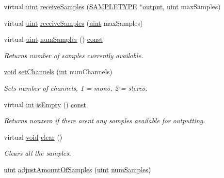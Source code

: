 \begin{DoxyCompactItemize}
\item 
virtual \hyperlink{_s_t_types_8h_a91ad9478d81a7aaf2593e8d9c3d06a14}{uint} \hyperlink{classsoundtouch_1_1_f_i_f_o_sample_buffer_a9bec369673be4b4d328befe0afd9f137}{receive\+Samples} (\hyperlink{namespacesoundtouch_a97cfd29a7abb4d4b2a72f803d5b5850c}{S\+A\+M\+P\+L\+E\+T\+Y\+PE} $\ast$\hyperlink{mm_8c_aeb3fcf4ab0f02cc4420e5a97568a07ef}{output}, \hyperlink{_s_t_types_8h_a91ad9478d81a7aaf2593e8d9c3d06a14}{uint} max\+Samples)
\item 
virtual \hyperlink{_s_t_types_8h_a91ad9478d81a7aaf2593e8d9c3d06a14}{uint} \hyperlink{classsoundtouch_1_1_f_i_f_o_sample_buffer_a1956c4d63018ed733d70125337265372}{receive\+Samples} (\hyperlink{_s_t_types_8h_a91ad9478d81a7aaf2593e8d9c3d06a14}{uint} max\+Samples)
\item 
virtual \hyperlink{_s_t_types_8h_a91ad9478d81a7aaf2593e8d9c3d06a14}{uint} \hyperlink{classsoundtouch_1_1_f_i_f_o_sample_buffer_a6b6b914d52e4e5d952f160e9c3b54d66}{num\+Samples} () \hyperlink{getopt1_8c_a2c212835823e3c54a8ab6d95c652660e}{const} 
\begin{DoxyCompactList}\small\item\em Returns number of samples currently available. \end{DoxyCompactList}\item 
\hyperlink{sound_8c_ae35f5844602719cf66324f4de2a658b3}{void} \hyperlink{classsoundtouch_1_1_f_i_f_o_sample_buffer_a8e9630f4f9c41ef1be3f44d546be0e87}{set\+Channels} (\hyperlink{xmltok_8h_a5a0d4a5641ce434f1d23533f2b2e6653}{int} num\+Channels)
\begin{DoxyCompactList}\small\item\em Sets number of channels, 1 = mono, 2 = stereo. \end{DoxyCompactList}\item 
virtual \hyperlink{xmltok_8h_a5a0d4a5641ce434f1d23533f2b2e6653}{int} \hyperlink{classsoundtouch_1_1_f_i_f_o_sample_buffer_a6e42894951c896ed0e71bd90ccdf9147}{is\+Empty} () \hyperlink{getopt1_8c_a2c212835823e3c54a8ab6d95c652660e}{const} 
\begin{DoxyCompactList}\small\item\em Returns nonzero if there aren\textquotesingle{}t any samples available for outputting. \end{DoxyCompactList}\item 
virtual \hyperlink{sound_8c_ae35f5844602719cf66324f4de2a658b3}{void} \hyperlink{classsoundtouch_1_1_f_i_f_o_sample_buffer_a2b211a51e213f86e2e5a03d0715da7b5}{clear} ()
\begin{DoxyCompactList}\small\item\em Clears all the samples. \end{DoxyCompactList}\item 
\hyperlink{_s_t_types_8h_a91ad9478d81a7aaf2593e8d9c3d06a14}{uint} \hyperlink{classsoundtouch_1_1_f_i_f_o_sample_buffer_a3f32f4db9c4268c9be61a32acd715f5f}{adjust\+Amount\+Of\+Samples} (\hyperlink{_s_t_types_8h_a91ad9478d81a7aaf2593e8d9c3d06a14}{uint} \hyperlink{classsoundtouch_1_1_f_i_f_o_sample_buffer_a6b6b914d52e4e5d952f160e9c3b54d66}{num\+Samples})
\end{DoxyCompactItemize}


